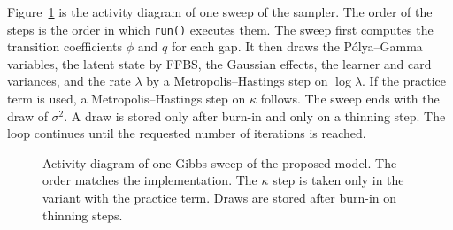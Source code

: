 Figure~\ref{fig:tk_activity_sweep} is the activity diagram of one sweep of the sampler. The order of the steps is the
order in which \texttt{run()} executes them. The sweep first computes the transition coefficients $\phi$ and $q$ for
each gap. It then draws the P\'olya--Gamma variables, the latent state by FFBS, the Gaussian effects, the learner and
card variances, and the rate $\lambda$ by a Metropolis--Hastings step on $\log\lambda$. If the practice term is
used, a Metropolis--Hastings step on $\kappa$ follows. The sweep ends with the draw of $\sigma^2$. A draw is stored
only after burn-in and only on a thinning step. The loop continues until the requested number of iterations is
reached.

\begin{figure}[htbp]
  \centering
  
  \caption{Activity diagram of one Gibbs sweep of the proposed model. The order matches the implementation. The
    $\kappa$ step is taken only in the variant with the practice term. Draws are stored after burn-in on thinning
    steps.}
  \label{fig:tk_activity_sweep}
\end{figure}
